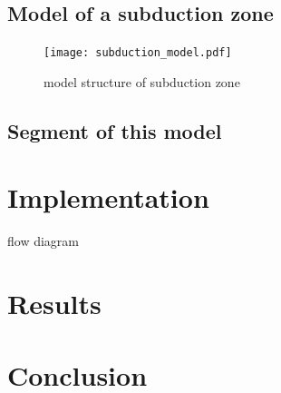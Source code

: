 \documentclass[12pt]{scrartcl}
\begin{document}
\subsection{Model of a subduction zone}
\begin{figure}[!ht]
\texttt{[image: subduction\_model.pdf]}
\caption{model structure of subduction zone}
\end{figure}


\subsection{Segment of this model}




\section{Implementation}

flow diagram
\section{Results}
\section{Conclusion}

\nocite{vargas2013tearing}
\nocite{gerya2009introduction}




\newpage



\end{document}
